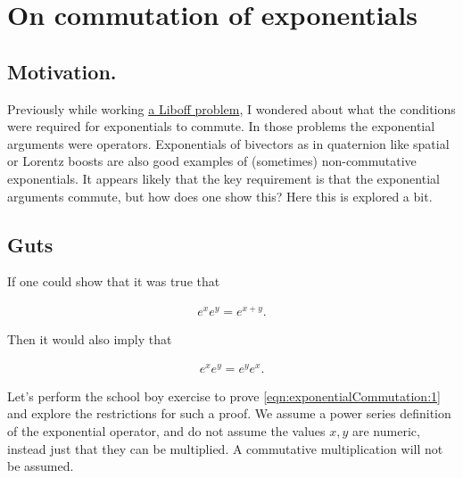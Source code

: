 %
%

\chapter{On commutation of exponentials}
\label{chap:exponentialCommutation}
{}
\date{May 30, 2010}

\beginArtNoToc

\section{Motivation.}

Previously while working 
\href{http://peeterjoot.wordpress.com/2010/05/23/effect-of-sinusoid-operators/}{a Liboff problem}, I wondered about what the conditions were required for exponentials to commute.  In those problems the exponential arguments were operators.  Exponentials of bivectors as in quaternion like spatial or Lorentz boosts are also good examples of (sometimes) non-commutative exponentials.  It appears likely that the key requirement is that the exponential arguments commute, but how does one show this?  Here this is explored a bit.

\section{Guts}

If one could show that it was true that

\begin{align}\label{eqn:exponentialCommutation:1}
e^{x} e^{y} = e^{x + y}.
\end{align}

Then it would also imply that 

\begin{align}\label{eqn:exponentialCommutation:2}
e^{x} e^{y} = e^{y} e^{x}.
\end{align}

Let's perform the school boy exercise to prove \ref{eqn:exponentialCommutation:1} and explore the restrictions for such a proof.  We assume a power series definition of the exponential operator, and do not assume the values $x,y$ are numeric, instead just that they can be multiplied.  A commutative multiplication will not be assumed.

